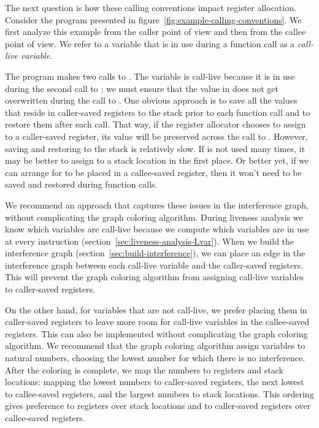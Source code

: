 \documentclass[7x10]{TimesAPriori_MIT}%
\numberwithin{theorem}{chapter}
\numberwithin{definition}{chapter}
\numberwithin{equation}{chapter}
\begin{document}
The next question is how these calling conventions impact register
allocation. Consider the \LangVar{} program presented in
figure~\ref{fig:example-calling-conventions}.  We first analyze this
example from the caller point of view and then from the callee point
of view. We refer to a variable that is in use during a function call
as a \emph{call-live variable}.

The program makes two calls to \READOP{}.  The variable  is
call-live because it is in use during the second call to \READOP{}; we
must ensure that the value in  does not get overwritten during
the call to \READOP{}.  One obvious approach is to save all the values
that reside in caller-saved registers to the stack prior to each
function call and to restore them after each call. That way, if the
register allocator chooses to assign  to a caller-saved
register, its value will be preserved across the call to \READOP{}.
However, saving and restoring to the stack is relatively slow. If
 is not used many times, it may be better to assign 
to a stack location in the first place. Or better yet, if we can
arrange for  to be placed in a callee-saved register, then it
won't need to be saved and restored during function calls.

We recommend an approach that captures these issues in the
interference graph, without complicating the graph coloring algorithm.
During liveness analysis we know which variables are call-live because
we compute which variables are in use at every instruction
(section~\ref{sec:liveness-analysis-Lvar}). When we build the
interference graph (section~\ref{sec:build-interference}), we can
place an edge in the interference graph between each call-live
variable and the caller-saved registers. This will prevent the graph
coloring algorithm from assigning call-live variables to caller-saved
registers.

On the other hand, for variables that are not call-live, we prefer
placing them in caller-saved registers to leave more room for
call-live variables in the callee-saved registers. This can also be
implemented without complicating the graph coloring algorithm. We
recommend that the graph coloring algorithm assign variables to
natural numbers, choosing the lowest number for which there is no
interference. After the coloring is complete, we map the numbers to
registers and stack locations: mapping the lowest numbers to
caller-saved registers, the next lowest to callee-saved registers, and
the largest numbers to stack locations. This ordering gives preference
to registers over stack locations and to caller-saved registers over
callee-saved registers.
\end{document}
